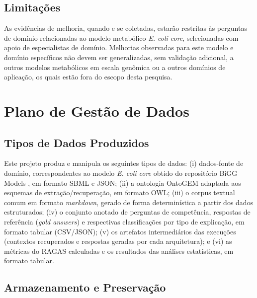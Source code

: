 \documentclass{article}
\begin{document}
	\subsection{Limitações}
	
	As evidências de melhoria, quando e se coletadas, estarão restritas às perguntas de domínio relacionadas ao modelo metabólico \textit{E. coli core}, selecionadas com apoio de especialistas de domínio. Melhorias observadas para este modelo e domínio específicos não devem ser generalizadas, sem validação adicional, a outros modelos metabólicos em escala genômica ou a outros domínios de aplicação, os quais estão fora do escopo desta pesquisa.
	
	\newpage
	
	\section{Plano de Gestão de Dados} %
	
	\subsection{Tipos de Dados Produzidos} %
	
	Este projeto produz e manipula os seguintes tipos de dados: (i) dados-fonte de domínio, correspondentes ao modelo \textit{E. coli core} obtido do repositório BiGG Models \cite{king2016bigg}, em formato SBML e JSON; (ii) a ontologia OntoGEM \cite{souza2025ontogem} adaptada aos esquemas de extração/recuperação, em formato OWL; (iii) o corpus textual comum em formato \textit{markdown}, gerado de forma determinística a partir dos dados estruturados; (iv) o conjunto anotado de perguntas de competência, respostas de referência (\textit{gold answers}) e respectivas classificações por tipo de explicação, em formato tabular (CSV/JSON); (v) os artefatos intermediários das execuções (contextos recuperados e respostas geradas por cada arquitetura); e (vi) as métricas do RAGAS calculadas e os resultados das análises estatísticas, em formato tabular. %
	
	\subsection{Armazenamento e Preservação} %
	
\end{document}
